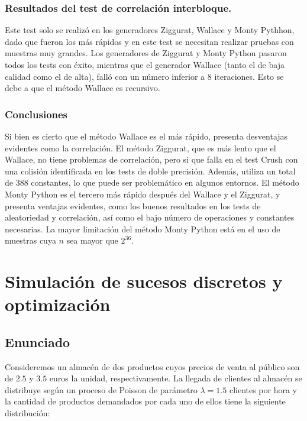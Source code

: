 \documentclass[a4paper,12pt]{article}
\begin{document}
	\subsubsection{Resultados del test de correlación interbloque.}
	Este test solo se realizó en los generadores Ziggurat, Wallace y Monty Pythhon, dado que fueron los más rápidos y en este test se necesitan realizar pruebas con muestras muy grandes. Los generadores de Ziggurat y Monty Python pasaron todos los tests con éxito, mientras que el generador Wallace (tanto el de baja calidad como el de alta), falló con un número inferior a $8$ iteraciones. Esto se debe a que el método Wallace es recursivo.
	
	\subsubsection{Conclusiones}
	Si bien es cierto que el método Wallace es el más rápido, presenta desventajas evidentes como la correlación. 
	El método Ziggurat, que es más lento que el Wallace, no tiene problemas de correlación, pero si que falla en el test Crush con una colisión identificada en los tests de doble precisión. 
	Además, utiliza un total de $388$ constantes, lo que puede ser problemático en algunos entornos. 
	El método Monty Python es el tercero más rápido después del Wallace y el Ziggurat, y presenta ventajas evidentes, como los buenos resultados en los tests de aleatoriedad y correlación, así como el bajo número de operaciones y constantes necesarias. 
	La mayor limitación del método Monty Python está en el uso de muestras cuya $n$ sea mayor que $2^{36}$. 
	
	
	
	
	\newpage

	\section{Simulación de sucesos discretos y optimización}

	\subsection{Enunciado}

	Consideremos un almacén de dos productos cuyos precios de venta al público son de $2.5$ y $3.5$ euros la unidad, respectivamente. La llegada de clientes al almacén se distribuye según un proceso de Poisson de parámetro $\lambda = 1.5$ clientes por hora y la cantidad de productos demandados por cada uno de ellos tiene la siguiente distribución:
\end{document}
